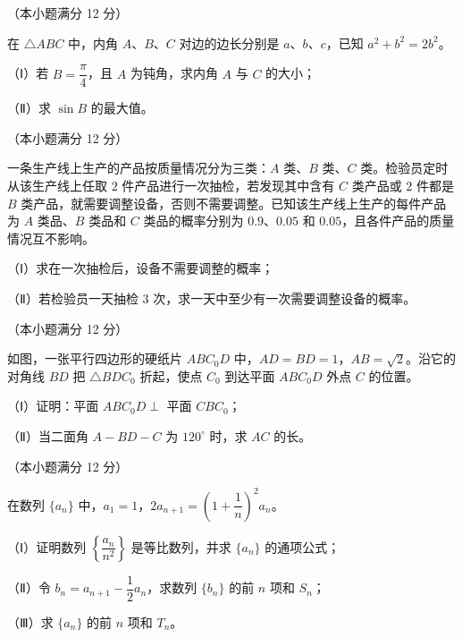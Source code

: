\begin{question}
（本小题满分 12 分）

在 $\triangle ABC$ 中，内角 $A$、$B$、$C$ 对边的边长分别是 $a$、$b$、$c$，已知 $a^2+b^2=2b^2$。

（Ⅰ）若 $B=\dfrac{\pi}4$，且 $A$ 为钝角，求内角 $A$ 与 $C$ 的大小；

（Ⅱ）求 $\sin B$ 的最大值。

\end{question}
\begin{question}
（本小题满分 12 分）

一条生产线上生产的产品按质量情况分为三类：$A$ 类、$B$ 类、$C$ 类。检验员定时从该生产线上任取 $2$ 件产品进行一次抽检，若发现其中含有 $C$ 类产品或 $2$ 件都是 $B$ 类产品，就需要调整设备，否则不需要调整。已知该生产线上生产的每件产品为 $A$ 类品、$B$ 类品和 $C$ 类品的概率分别为 $0.9$、$0.05$ 和 $0.05$，且各件产品的质量情况互不影响。

（Ⅰ）求在一次抽检后，设备不需要调整的概率；

（Ⅱ）若检验员一天抽检 $3$ 次，求一天中至少有一次需要调整设备的概率。

\Needspace{0.4\textheight}
\end{question}
\begin{question}
（本小题满分 12 分）

如图，一张平行四边形的硬纸片 $ABC_0D$ 中，$AD=BD=1$，$AB=\sqrt2$。沿它的对角线 $BD$ 把 $\triangle BDC_0$ 折起，使点 $C_0$ 到达平面 $ABC_0D$ 外点 $C$ 的位置。

（Ⅰ）证明：平面 $ABC_0D\perp$ 平面 $CBC_0$；

（Ⅱ）当二面角 $A-BD-C$ 为 $120^\circ$ 时，求 $AC$ 的长。
\nopagebreak[4]
\begin{center}\end{center}
\nopagebreak[4]
\end{question}
\begin{question}
（本小题满分 12 分）

在数列 $\{a_n\}$ 中，$a_1=1$，$2a_{n+1}=\left(1+\dfrac1n\right)^2a_n$。

（Ⅰ）证明数列 $\left\{\dfrac{a_n}{n^2}\right\}$ 是等比数列，并求 $\{a_n\}$ 的通项公式；

（Ⅱ）令 $b_n=a_{n+1}-\dfrac12a_n$，求数列 $\{b_n\}$ 的前 $n$ 项和 $S_n$；

（Ⅲ）求 $\{a_n\}$ 的前 $n$ 项和 $T_n$。

\end{question}
